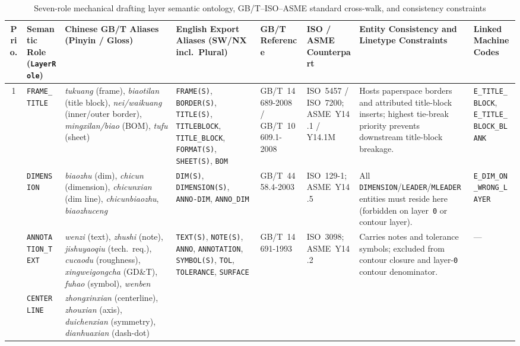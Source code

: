 \documentclass[nocopyright,nolists,upint,varvw,hyphenate]{asmejour}
\begin{document}
\begin{table}[t]
\caption{Seven-role mechanical drafting layer semantic ontology, GB/T--ISO--ASME standard cross-walk, and consistency constraints}\label{tab:supp_layer_ontology}
\centering
\scriptsize
\setlength{\tabcolsep}{2.5pt}
%
\begin{tabularx}{\textwidth}{c L{2.05cm} L{2.45cm} L{2.35cm} L{1.75cm} L{1.85cm} Y L{2.35cm}}
\toprule
Prio. & Semantic Role (\texttt{LayerRole}) & Chinese GB/T Aliases (Pinyin / Gloss) & English Export Aliases (SW/NX incl.\ Plural) & GB/T Reference & ISO / ASME Counterpart & Entity Consistency and Linetype Constraints & Linked Machine Codes \\
 & \texttt{FRAME\_TITLE} &
\emph{tukuang} (frame), \emph{biaotilan} (title block), \emph{nei/waikuang} (inner/outer border), \emph{mingxilan/biao} (BOM), \emph{tufu} (sheet) &
\texttt{FRAME(S)}, \texttt{BORDER(S)}, \texttt{TITLE(S)}, \texttt{TITLEBLOCK}, \texttt{TITLE\_BLOCK}, \texttt{FORMAT(S)}, \texttt{SHEET(S)}, \texttt{BOM} &
GB/T~14689-2008 / GB/T~10609.1-2008 &
ISO~5457 / ISO~7200; ASME~Y14.1 / Y14.1M &
Hosts paperspace borders and attributed title-block inserts; highest tie-break priority prevents downstream title-block breakage. &
\texttt{E\_TITLE\_BLOCK}, \texttt{E\_TITLE\_BLOCK\_BLANK} \\
 & \texttt{DIMENSION} &
\emph{biaozhu} (dim), \emph{chicun} (dimension), \emph{chicunxian} (dim line), \emph{chicunbiaozhu}, \emph{biaozhuceng} &
\texttt{DIM(S)}, \texttt{DIMENSION(S)}, \texttt{ANNO-DIM}, \texttt{ANNO\_DIM} &
GB/T~4458.4-2003 &
ISO~129-1; ASME~Y14.5 &
All \texttt{DIMENSION}/\texttt{LEADER}/\texttt{MLEADER} entities must reside here (forbidden on layer~\texttt{0} or contour layer). &
\texttt{E\_DIM\_ON\_WRONG\_LAYER} \\
 & \texttt{ANNOTATION\_TEXT} &
\emph{wenzi} (text), \emph{zhushi} (note), \emph{jishuyaoqiu} (tech.\ req.), \emph{cucaodu} (roughness), \emph{xingweigongcha} (GD\&T), \emph{fuhao} (symbol), \emph{wenben} &
\texttt{TEXT(S)}, \texttt{NOTE(S)}, \texttt{ANNO}, \texttt{ANNOTATION}, \texttt{SYMBOL(S)}, \texttt{TOL}, \texttt{TOLERANCE}, \texttt{SURFACE} &
GB/T~14691-1993 &
ISO~3098; ASME~Y14.2 &
Carries notes and tolerance symbols; excluded from contour closure and layer-\texttt{0} contour denominator. &
--- \\
 & \texttt{CENTERLINE} &
\emph{zhongxinxian} (centerline), \emph{zhouxian} (axis), \emph{duichenxian} (symmetry), \emph{dianhuaxian} (dash-dot) &

\end{tabularx}
\end{table}
\end{document}
